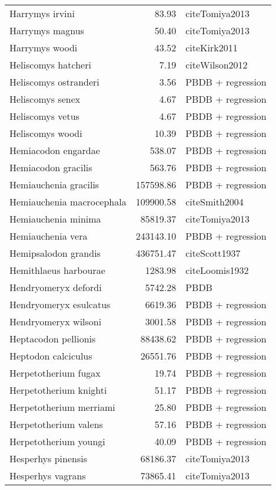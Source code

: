\begin{table}[ht]
\begin{tabular}{lrl}
  Harrymys irvini & 83.93 & cite{Tomiya2013} \\ 
  Harrymys magnus & 50.40 & cite{Tomiya2013} \\ 
  Harrymys woodi & 43.52 & cite{Kirk2011} \\ 
  Heliscomys hatcheri & 7.19 & cite{Wilson2012} \\ 
  Heliscomys ostranderi & 3.56 & PBDB + regression \\ 
  Heliscomys senex & 4.67 & PBDB + regression \\ 
  Heliscomys vetus & 4.67 & PBDB + regression \\ 
  Heliscomys woodi & 10.39 & PBDB + regression \\ 
  Hemiacodon engardae & 538.07 & PBDB + regression \\ 
  Hemiacodon gracilis & 563.76 & PBDB + regression \\ 
  Hemiauchenia gracilis & 157598.86 & PBDB + regression \\ 
  Hemiauchenia macrocephala & 109900.58 & cite{Smith2004} \\ 
  Hemiauchenia minima & 85819.37 & cite{Tomiya2013} \\ 
  Hemiauchenia vera & 243143.10 & PBDB + regression \\ 
  Hemipsalodon grandis & 436751.47 & cite{Scott1937} \\ 
  Hemithlaeus harbourae & 1283.98 & cite{Loomis1932} \\ 
  Hendryomeryx defordi & 5742.28 & PBDB \\ 
  Hendryomeryx esulcatus & 6619.36 & PBDB + regression \\ 
  Hendryomeryx wilsoni & 3001.58 & PBDB + regression \\ 
  Heptacodon pellionis & 88438.62 & PBDB + regression \\ 
  Heptodon calciculus & 26551.76 & PBDB + regression \\ 
  Herpetotherium fugax & 19.74 & PBDB + regression \\ 
  Herpetotherium knighti & 51.17 & PBDB + regression \\ 
  Herpetotherium merriami & 25.80 & PBDB + regression \\ 
  Herpetotherium valens & 57.16 & PBDB + regression \\ 
  Herpetotherium youngi & 40.09 & PBDB + regression \\ 
  Hesperhys pinensis & 68186.37 & cite{Tomiya2013} \\ 
  Hesperhys vagrans & 73865.41 & cite{Tomiya2013} \\ 

\end{tabular}
\end{table}
